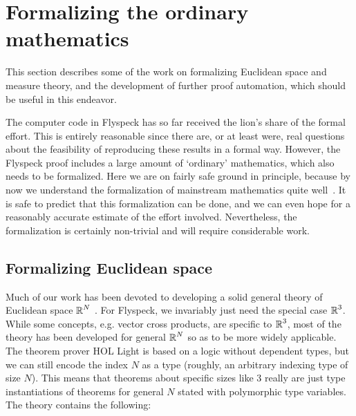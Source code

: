 \documentclass[11pt]{amsart}
\newcommand{\real}{\mbox{$\protect\mathbb R$}}
\begin{document}
\section{Formalizing the ordinary mathematics}
\label{sec:ordinary}

This section describes some of the
work on formalizing Euclidean space and measure theory, and the development of
further proof automation, which should be useful in this endeavor.

The computer code in Flyspeck has so far received the lion's share of the
formal effort. This is entirely reasonable since there are, or at least were,
real questions about the feasibility of reproducing these results in a formal
way. However, the Flyspeck proof includes a large amount of `ordinary'
mathematics, which also needs to be formalized. Here we are on fairly safe
ground in principle, because by now we understand the formalization of
mainstream mathematics quite well~\cite{wiedijk-17}. It is safe to predict that
this formalization can be done, and we can even hope for a reasonably accurate
estimate of the effort involved. Nevertheless, the formalization is certainly
non-trivial and will require considerable work.

\subsection{Formalizing Euclidean space}

Much of our work has been devoted to developing a solid general theory of
Euclidean space $\real^N$ \cite{harrison-euclidean}. For Flyspeck, we
invariably just need the special case $\real^3$. While some concepts, e.g.
vector cross products, are specific to $\real^3$, most of the theory has been
developed for general $\real^N$ so as to be more widely applicable. The theorem
prover HOL Light \cite{harrison-demo} is based on a logic without dependent
types, but we can still encode the index $N$ as a type (roughly, an arbitrary
indexing type of size $N$). This means that theorems about specific sizes like
$3$ really are just type instantiations of theorems for general $N$ stated with
polymorphic type variables. The theory contains the following:
\end{document}
